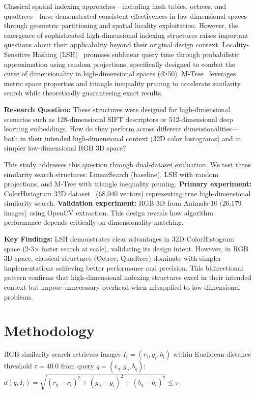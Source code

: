 \documentclass{sbc2023}
\begin{document}
Classical spatial indexing approaches—including hash tables, octrees, and quadtrees—have demonstrated consistent effectiveness in low-dimensional spaces through geometric partitioning and spatial locality exploitation. However, the emergence of sophisticated high-dimensional indexing structures raises important questions about their applicability beyond their original design context. Locality-Sensitive Hashing (LSH)~\cite{indyk1998approximate} promises sublinear query time through probabilistic approximation using random projections, specifically designed to combat the curse of dimensionality in high-dimensional spaces (d≥50). M-Tree~\cite{ciaccia1997m} leverages metric space properties and triangle inequality pruning to accelerate similarity search while theoretically guaranteeing exact results.

\textbf{Research Question:} These structures were designed for high-dimensional scenarios such as 128-dimensional SIFT descriptors or 512-dimensional deep learning embeddings. How do they perform across different dimensionalities—both in their intended high-dimensional context (32D color histograms) and in simpler low-dimensional RGB 3D space?

This study addresses this question through dual-dataset evaluation. We test three similarity search structures: LinearSearch (baseline), LSH with random projections, and M-Tree with triangle inequality pruning. \textbf{Primary experiment:} ColorHistogram 32D dataset~\cite{uci_corel_features} (68,040 vectors) representing true high-dimensional similarity search. \textbf{Validation experiment:} RGB 3D from Animals-10 (26,179 images) using OpenCV extraction. This design reveals how algorithm performance depends critically on dimensionality matching.

\textbf{Key Findings:} LSH demonstrates clear advantages in 32D ColorHistogram space (2-3× faster search at scale), validating its design intent. However, in RGB 3D space, classical structures (Octree, Quadtree) dominate with simpler implementations achieving better performance and precision. This bidirectional pattern confirms that high-dimensional indexing structures excel in their intended context but impose unnecessary overhead when misapplied to low-dimensional problems.

\section{Methodology}
\label{sec:methodology}

RGB similarity search retrieves images $I_i=(r_i,g_i,b_i)$ within Euclidean distance threshold $\tau=40.0$ from query $q=(r_q,g_q,b_q)$: $d(q,I_i)=\sqrt{(r_q-r_i)^2+(g_q-g_i)^2+(b_q-b_i)^2} \leq \tau$.
\end{document}
